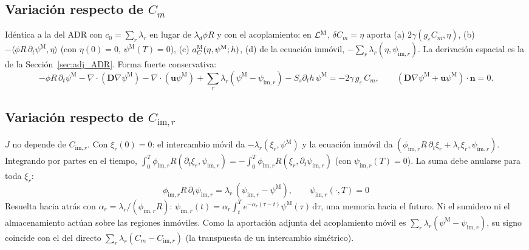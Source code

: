 \documentclass[11pt]{article}
\numberwithin{equation}{section}
\theoremstyle{remark}
\newcommand{\bu}{\mathbf{u}}
\newcommand{\bD}{\mathbf{D}}
\newcommand{\bn}{\mathbf{n}}
\newcommand{\geps}{g_\varepsilon}
\newcommand{\im}{\mathrm{im}}
\newcommand{\pM}{\psi^{\mathrm{M}}}    %
\newcommand{\pim}{\psi_{\im,r}}          %
\newcommand{\dd}{\,\mathrm{d}}
\begin{document}
\subsection{Variaci\'on respecto de $C_m$}
Id\'entica a la del ADR con $c_0=\sum_r\lambda_r$ en lugar de $\lambda_d\phi R$ y con el acoplamiento: en $\mathcal{L}^{\rm M}$, $\delta C_m=\eta$ aporta (a) $2\gamma(\geps C_m,\eta)$,
(b) $-\langle\phi R\,\partial_t\pM,\eta\rangle$ (con $\eta(0)=0$, $\pM(T)=0$), (c) $a_C^{\rm M}(\eta,\pM;h)$, (d) de la ecuaci\'on inm\'ovil, $-\sum_r\lambda_r(\eta,\pim)$.
La derivaci\'on espacial es la de la Secci\'on~\ref{sec:adj_ADR}. Forma fuerte conservativa:
\begin{equation}
-\phi R\,\partial_t\pM-\nabla\!\cdot(\bD\nabla\pM)-\nabla\!\cdot(\bu\pM)+\sum_r\lambda_r(\pM-\pim)-S_s\partial_th\,\pM=-2\gamma\,\geps\,C_m,\qquad(\bD\nabla\pM+\bu\pM)\cdot\bn=0 .
\label{eq:adj_fuerte_M}
\end{equation}

\subsection{Variaci\'on respecto de $C_{\im,r}$}
$J$ no depende de $C_{\im,r}$. Con $\xi_r(0)=0$: el intercambio m\'ovil da $-\lambda_r(\xi_r,\pM)$ y la ecuaci\'on inm\'ovil da
$(\phi_{\im,r}R\,\partial_t\xi_r+\lambda_r\xi_r,\pim)$. Integrando por partes en el tiempo, $\int_0^T\phi_{\im,r}R(\partial_t\xi_r,\pim)=-\int_0^T\phi_{\im,r}R(\xi_r,\partial_t\pim)$ (con $\pim(T)=0$). La suma debe anularse para toda $\xi_r$:
\begin{equation}
\boxed{\ \phi_{\im,r}R\,\partial_t\pim=\lambda_r\,(\pim-\pM),\qquad\pim(\cdot,T)=0\ }
\label{eq:adj_inmovil}
\end{equation}
Resuelta hacia atr\'as con $\alpha_r=\lambda_r/(\phi_{\im,r}R)$: $\pim(t)=\alpha_r\int_t^Te^{-\alpha_r(\tau-t)}\pM(\tau)\dd\tau$, una memoria hacia el futuro. Ni el sumidero ni el almacenamiento actúan sobre las regiones inm\'oviles.
Como la aportaci\'on adjunta del acoplamiento m\'ovil es $\sum_r\lambda_r(\pM-\pim)$, su signo coincide con el del directo $\sum_r\lambda_r(C_m-C_{\im,r})$ (la transpuesta de un intercambio sim\'etrico).
\end{document}
